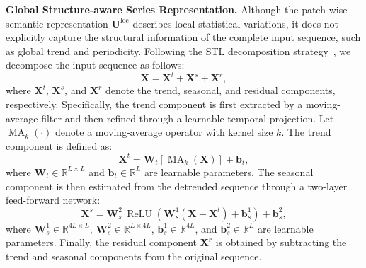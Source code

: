 \documentclass[letterpaper]{article} %
\begin{document}
\noindent\textbf{Global Structure-aware Series Representation.}
Although the patch-wise semantic representation $\mathbf{U}^{\mathrm{loc}}$ describes local statistical variations, it does not explicitly capture the structural information of the complete input sequence, such as global trend and periodicity. Following the STL decomposition strategy~\cite{cao2024tempo}, we decompose the input sequence as follows:
\begin{equation}
    \mathbf{X}=\mathbf{X}^{t}+\mathbf{X}^{s}+\mathbf{X}^{r},
\end{equation}
where $\mathbf{X}^{t}$, $\mathbf{X}^{s}$, and $\mathbf{X}^{r}$ denote the trend, seasonal, and residual components, respectively. Specifically, the trend component is first extracted by a moving-average
filter and then refined through a learnable temporal projection. Let
$\operatorname{MA}_{k}(\cdot)$ denote a moving-average operator with
kernel size $k$. The trend component is defined as:
\begin{equation}
    \mathbf{X}^{t}=\mathbf{W}_{t}[\operatorname{MA}_{k}(\mathbf{X})] + \mathbf{b}_{t},
\end{equation}
where $\mathbf{W}_{t}\in\mathbb{R}^{L\times L}$ and
$\mathbf{b}_{t}\in\mathbb{R}^{L}$ are learnable parameters.
The seasonal component is then estimated from the detrended sequence
through a two-layer feed-forward network:
\begin{equation}
    \mathbf{X}^{s}
    =
    \mathbf{W}_{s}^2
    \,
    \operatorname{ReLU}
    \left(
    \mathbf{W}_{s}^1
    (    \mathbf{X}
    -
    \mathbf{X}^{t})
    +
    \mathbf{b}_{s}^1
    \right)
    +
    \mathbf{b}_{s}^2
    ,
\end{equation}
where $\mathbf{W}_{s}^1\in\mathbb{R}^{4L\times L}$,
$\mathbf{W}_{s}^2\in\mathbb{R}^{L\times4L}$,
$\mathbf{b}_{s}^1\in\mathbb{R}^{4L}$, and
$\mathbf{b}_{s}^2\in\mathbb{R}^{L}$ are learnable parameters.
Finally, the residual component $\mathbf{X}^{r}$ is obtained by subtracting the trend
and seasonal components from the original sequence.


\end{document}
